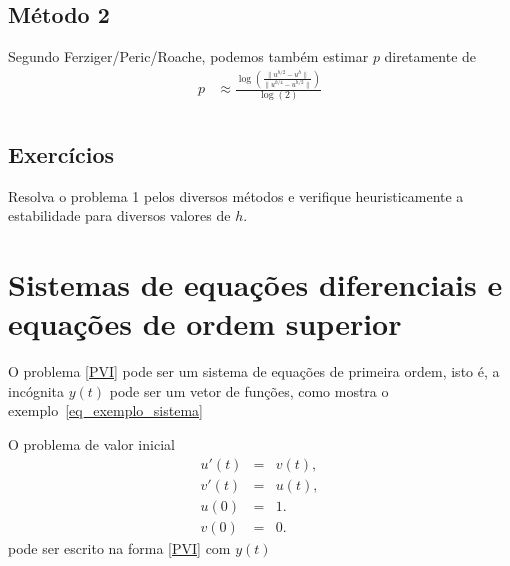 \subsection{Método 2}
Segundo Ferziger/Peric/Roache, podemos também estimar $p$ diretamente de
\begin{eqnarray}
  p  & \approx  \frac{ \log \left(   \frac{\|u^{h/2}-u^{h}\|}{\|u^{h/4}-u^{h/2}\|} \right)  }{\log(2)} \\
\end{eqnarray}













\subsection*{Exercícios}

\begin{exer} Resolva o problema 1 pelos diversos métodos e verifique heuristicamente a estabilidade para diversos valores de $h$.
\end{exer}











\section{Sistemas de equações diferenciais e equações de ordem superior}
O problema \eqref{PVI} pode ser um sistema de equações de primeira ordem, isto é, a incógnita $y(t)$ pode ser um vetor de funções, como mostra o exemplo~\ref{eq_exemplo_sistema}
\begin{ex}\label{exemplo_sistema_PVI}O problema de valor inicial
\begin{subequations}\label{eq_exemplo_sistema}
\begin{eqnarray}
u'(t)&=&v(t),\\
v'(t)&=&u(t),\\
u(0)&=&1.\\
v(0)&=&0.
\end{eqnarray}
\end{subequations}
pode ser escrito na forma \eqref{PVI} com $y(t)$
\end{ex}

